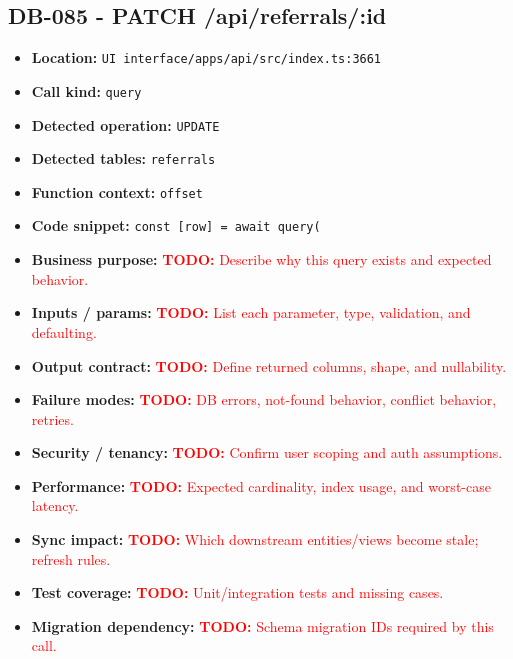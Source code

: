 \documentclass[11pt]{article}
\newcommand{\todoitem}[1]{\textcolor{red}{\textbf{TODO:} #1}}
\begin{document}
\subsection{DB-085 - PATCH /api/referrals/:id}
\begin{itemize}[leftmargin=1.5em]
\item \textbf{Location:} \texttt{UI interface/apps/api/src/index.ts:3661}
\item \textbf{Call kind:} \texttt{query}
\item \textbf{Detected operation:} \texttt{UPDATE}
\item \textbf{Detected tables:} \texttt{referrals}
\item \textbf{Function context:} \texttt{offset}
\item \textbf{Code snippet:} \texttt{const [row] = await query(}
\item \textbf{Business purpose:} \todoitem{Describe why this query exists and expected behavior.}
\item \textbf{Inputs / params:} \todoitem{List each parameter, type, validation, and defaulting.}
\item \textbf{Output contract:} \todoitem{Define returned columns, shape, and nullability.}
\item \textbf{Failure modes:} \todoitem{DB errors, not-found behavior, conflict behavior, retries.}
\item \textbf{Security / tenancy:} \todoitem{Confirm user scoping and auth assumptions.}
\item \textbf{Performance:} \todoitem{Expected cardinality, index usage, and worst-case latency.}
\item \textbf{Sync impact:} \todoitem{Which downstream entities/views become stale; refresh rules.}
\item \textbf{Test coverage:} \todoitem{Unit/integration tests and missing cases.}
\item \textbf{Migration dependency:} \todoitem{Schema migration IDs required by this call.}
\end{itemize}
\end{document}
